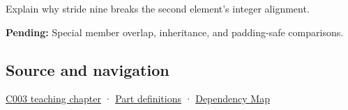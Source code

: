 Explain why stride nine breaks the second element's integer alignment.

\textbf{Pending:} Special member overlap, inheritance, and padding-safe comparisons.

\subsection{Source and navigation}\label{appendix-f52f8c5a3afd-source-and-navigation}

\hyperref[01-foundations-i-ch002-where-the-bytes-live]{C003 teaching chapter} · \hyperref[appendix-fd090d982a15-m003---parts-41-60]{Part definitions} · \hyperref[appendix-4ad47bdd269a]{Dependency Map}
